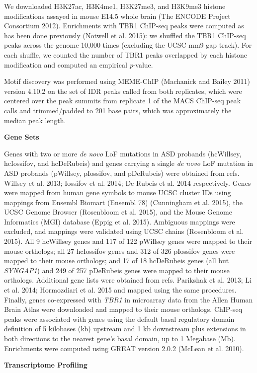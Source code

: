 \documentclass[]{article}
\begin{document}
We downloaded H3K27ac, H3K4me1, H3K27me3, and H3K9me3 histone
modifications assayed in mouse E14.5 whole brain (The ENCODE Project
Consortium 2012). Enrichments with TBR1 ChIP-seq peaks were computed as
has been done previously (Notwell et al. 2015): we shuffled the TBR1
ChIP-seq peaks across the genome 10,000 times (excluding the UCSC mm9
gap track). For each shuffle, we counted the number of TBR1 peaks
overlapped by each histone modification and computed an empirical
\emph{p}-value.

Motif discovery was performed using MEME-ChIP (Machanick and Bailey
2011) version 4.10.2 on the set of IDR peaks called from both
replicates, which were centered over the peak summits from replicate 1
of the MACS ChIP-seq peak calls and trimmed/padded to 201 base pairs,
which was approximately the median peak length.

\textbf{Gene Sets}

Genes with two or more \emph{de novo} LoF mutations in ASD probands
(hcWillsey, hcIossifov, and hcDeRubeis) and genes carrying a single
\emph{de novo} LoF mutation in ASD probands (pWillsey, pIossifov, and
pDeRubeis) were obtained from refs. Willsey et al. 2013; Iossifov et al.
2014; De Rubeis et al. 2014 respectively. Genes were mapped from human
gene symbols to mouse UCSC cluster IDs using mappings from Ensembl
Biomart (Ensembl 78) (Cunningham et al. 2015), the UCSC Genome Browser
(Rosenbloom et al. 2015), and the Mouse Genome Informatics (MGI)
database (Eppig et al. 2015). Ambiguous mappings were excluded, and
mappings were validated using UCSC chains (Rosenbloom et al. 2015). All
9 hcWillsey genes and 117 of 122 pWillsey genes were mapped to their
mouse orthologs; all 27 hcIossifov genes and 312 of 326 pIossifov genes
were mapped to their mouse orthologs; and 17 of 18 hcDeRubeis genes (all
but \emph{SYNGAP1}) and 249 of 257 pDeRubeis genes were mapped to their
mouse orthologs. Additional gene lists were obtained from refs.
Parikshak et al. 2013; Li et al. 2014; Hormozdiari et al. 2015 and
mapped using the same procedures. Finally, genes co-expressed with
\emph{TBR1} in microarray data from the Allen Human Brain Atlas were
downloaded and mapped to their mouse orthologs. ChIP-seq peaks were
associated with genes using the default basal regulatory domain
definition of 5 kilobases (kb) upstream and 1 kb downstream plus
extensions in both directions to the nearest gene's basal domain, up to
1 Megabase (Mb). Enrichments were computed using GREAT version 2.0.2
(McLean et al. 2010).

\textbf{Transcriptome Profiling}
\end{document}

